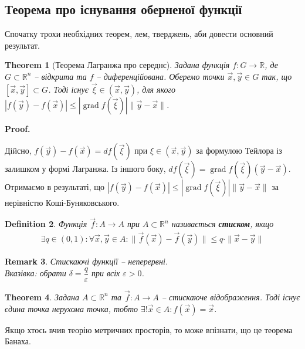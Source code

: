 \documentclass[a4paper, 10pt]{article}
\makeatletter
\DeclareMathOperator{\wordgrad}{grad}
\theoremstyle{theoremdd}
\newtheorem{theorem}{Theorem}[subsection]
\theoremstyle{theoremdd}
\theoremstyle{theoremdd}
\newtheorem{definition}[theorem]{Definition}
\theoremstyle{theoremdd}
\theoremstyle{theoremdd}
\theoremstyle{theoremdd}
\theoremstyle{theoremdd}
\newtheorem{remark}[theorem]{Remark}
\theoremstyle{theoremdd}
\theoremstyle{theoremdd}
\renewenvironment{proof}[1][Proof.\\]{\par
\pushQED{\hfill \qed}%
\normalfont \topsep6\p@\@plus6\p@\relax
\trivlist
\item\relax
{\bfseries
#1\@addpunct{.}}\hspace\labelsep\ignorespaces
}{%
\popQED\endtrivlist\@endpefalse
}
\makeatother
\begin{document}
\subsection{Теорема про існування оберненої функції}
Спочатку трохи необхідних теорем, лем, тверджень, аби довести основний результат.

\begin{theorem}[Теорема Лагранжа про середнє]
Задана функція $f \colon G \to \mathbb{R}$, де $G \subset \mathbb{R}^n$ -- відкрита та $f$ -- диференційована. Оберемо точки $\vec{x},\vec{y} \in G$ так, що $[\vec{x},\vec{y}] \subset G$. Тоді існує $\vec{\xi} \in (\vec{x},\vec{y})$, для якого $|f(\vec{y}) - f(\vec{x})| \leq |\wordgrad f(\vec{\xi})| \| \vec{y} - \vec{x} \|$.
\end{theorem}

\begin{proof}
Дійсно, $f(\vec{y}) - f(\vec{x}) = df(\vec{\xi})$ при $\xi \in (\vec{x},\vec{y})$ за формулою Тейлора із залишком у формі Лагранжа. Із іншого боку, $df(\vec{\xi}) = \wordgrad f(\vec{\xi}) (\vec{y} - \vec{x})$. Отримаємо в результаті, що $|f(\vec{y}) - f(\vec{x})| \leq |\wordgrad f(\vec{\xi})| \| \vec{y} - \vec{x} \|$ за нерівністю Коші-Буняковського.
\end{proof}

\begin{definition}
Функція $\vec{f} \colon A \to A$ при $A \subset \mathbb{R}^n$ називається \textbf{стиском}, якщо
\begin{align*}
\exists q \in (0,1): \forall \vec{x},\vec{y} \in A: \| \vec{f}(\vec{x}) - \vec{f}(\vec{y}) \| \leq q \cdot \| \vec{x} - \vec{y} \|
\end{align*}
\end{definition}

\begin{remark}
Стискаючі функції -- неперервні.\\
\textit{Вказівка: обрати $\delta = \dfrac{q}{\varepsilon}$ при всіх $\varepsilon > 0$.}
\end{remark}

\begin{theorem}
Задана $A \subset \mathbb{R}^n$ та $\vec{f} \colon A \to A$ -- стискаюче відображення. Тоді існує єдина точка нерухома точка, тобто $\exists ! \vec{x} \in A: f(\vec{x}) = \vec{x}$.
\end{theorem}
\noindent
Якщо хтось вчив теорію метричних просторів, то може впізнати, що це теорема Банаха.
\end{document}
